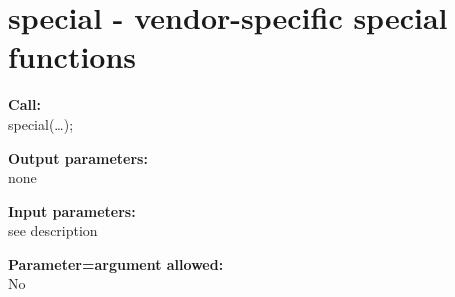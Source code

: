 %        
%        
%        
%        
%        


    \section{special - vendor-specific special functions}\label{sec:ipspecial}
        
        {\bf Call:} \\
        special(\dots);
        
        {\bf Output parameters:} \\
        none
        
        {\bf Input parameters:} \\
        see description
        
        {\bf Parameter=argument allowed:} \\
        No
        
